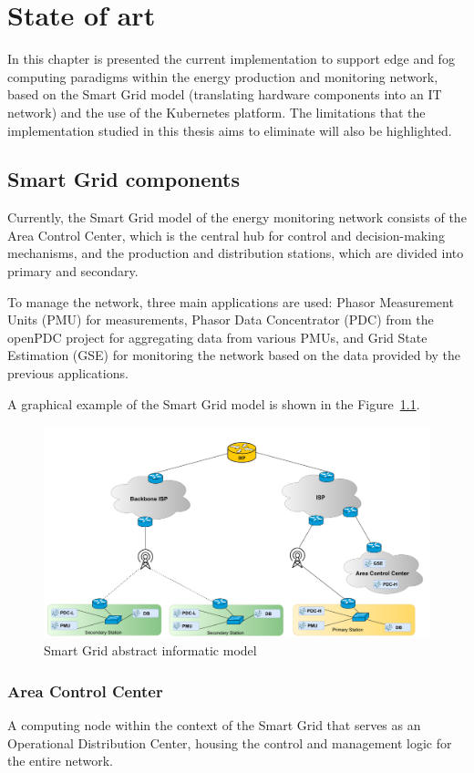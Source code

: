 \chapter{State of art}
In this chapter is presented the current implementation to support edge and fog computing paradigms within the energy production and monitoring network, based on the Smart Grid model (translating hardware components into an IT network) and the use of the Kubernetes platform. The limitations that the implementation studied in this thesis aims to eliminate will also be highlighted.

\section{Smart Grid components}
Currently, the Smart Grid model of the energy monitoring network consists of the Area Control Center, which is the central hub for control and decision-making mechanisms, and the production and distribution stations, which are divided into primary and secondary. 

To manage the network, three main applications are used: Phasor Measurement Units (PMU) for measurements, Phasor Data Concentrator (PDC) from the openPDC project for aggregating data from various PMUs, and Grid State Estimation (GSE) for monitoring the network based on the data provided by the previous applications. 

A graphical example of the Smart Grid model is shown in the Figure~\ref{fig:art-state}.
\begin{figure}[ht]\centering
\includegraphics[scale=0.17]{Pictures/state-of-art}
\caption{Smart Grid abstract informatic model}\label{fig:art-state}
\end{figure}

\subsection{Area Control Center}
A computing node within the context of the Smart Grid that serves as an Operational Distribution Center, housing the control and management logic for the entire network.

